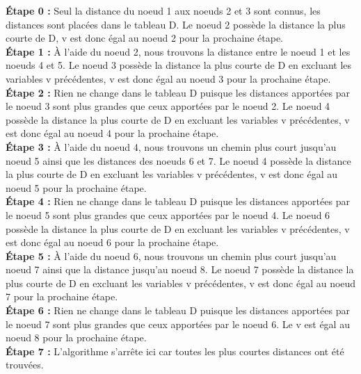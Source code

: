 \documentclass[12pt]{article}
\begin{document}
\textbf{Étape 0 :} Seul la distance du noeud 1 aux noeuds 2 et 3 sont connus, les distances sont placées dans le tableau D. Le noeud 2 possède la distance la plus courte de D, v est donc égal au noeud 2 pour la prochaine étape. \\

\textbf{Étape 1 :} À l'aide du noeud 2, nous trouvons la distance entre le noeud 1 et les noeuds 4 et 5. Le noeud 3 possède la distance la plus courte de D en excluant les variables v précédentes, v est donc égal au noeud 3 pour la prochaine étape. \\

\textbf{Étape 2 :} Rien ne change dans le tableau D puisque les distances apportées par le noeud 3 sont plus grandes que ceux apportées par le noeud 2. Le noeud 4 possède la distance la plus courte de D en excluant les variables v précédentes, v est donc égal au noeud 4 pour la prochaine étape. \\

\textbf{Étape 3 :} À l'aide du noeud 4, nous trouvons un chemin plus court jusqu'au noeud 5 ainsi que les distances des noeuds 6 et 7. Le noeud 4 possède la distance la plus courte de D en excluant les variables v précédentes, v est donc égal au noeud 5 pour la prochaine étape. \\

\textbf{Étape 4 :} Rien ne change dans le tableau D puisque les distances apportées par le noeud 5 sont plus grandes que ceux apportées par le noeud 4. Le noeud 6 possède la distance la plus courte de D en excluant les variables v précédentes, v est donc égal au noeud 6 pour la prochaine étape. \\

\textbf{Étape 5 :} À l'aide du noeud 6, nous trouvons un chemin plus court jusqu'au noeud 7 ainsi que la distance jusqu'au noeud 8. Le noeud 7 possède la distance la plus courte de D en excluant les variables v précédentes, v est donc égal au noeud 7 pour la prochaine étape. \\

\textbf{Étape 6 :} Rien ne change dans le tableau D puisque les distances apportées par le noeud 7 sont plus grandes que ceux apportées par le noeud 6. Le v est égal au noeud 8 pour la prochaine étape. \\

\textbf{Étape 7 :} L'algorithme s'arrête ici car toutes les plus courtes distances ont été trouvées. \\
\end{document}
